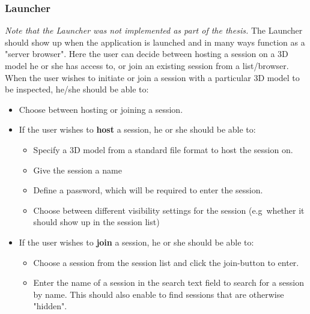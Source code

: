 \subsubsection{Launcher}
\textit{Note that the Launcher was not implemented as part of the thesis.}
The Launcher should show up when the application is launched and in many ways function as a "server browser".
Here the user can decide between hosting a session on a 3D model he or she has access to, or join an existing session from a list/browser.
When the user wishes to initiate or join a session with a particular 3D model to be inspected, he/she should be able to:

\begin{itemize}
	\item Choose between hosting or joining a session.
	\item If the user wishes to \textbf{host} a session, he or she should be able to: 
	\begin{itemize}
		\item Specify a 3D model from a standard file format to host the session on.
		\item Give the session a name
		\item Define a password, which will be required to enter the session. 
		\item Choose between different visibility settings for the session (e.g~whether it should show up in the session list)
	\end{itemize}
		
	\item If the user wishes to \textbf{join} a session, he or she should be able to:
	\begin{itemize}
		\item Choose a session from the session list and click the join-button to enter.
		\item Enter the name of a session in the search text field to search for a session by name.
			  This should also enable to find sessions that are otherwise "hidden".
	\end{itemize}	 
\end{itemize}


